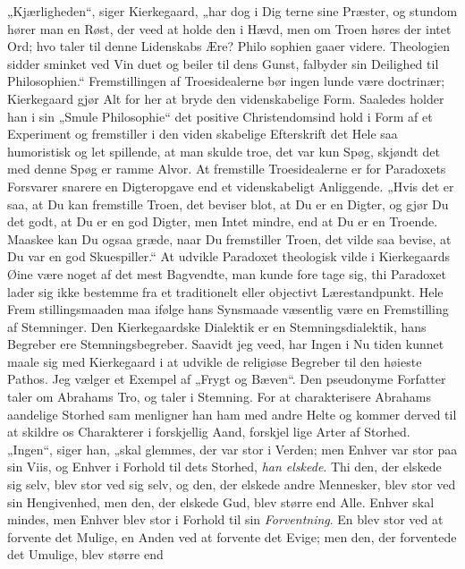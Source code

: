 \documentclass[12pt]{book}
\newcommand{\opage}[1]{\marginnote{\footnotesize\textit{[#1]}}}
\begin{document}
„Kjærligheden“, siger Kierkegaard, „har dog i Dig\-%
terne sine Præster, og stundom hører man en Røst, der
veed at holde den i Hævd, men om Troen høres der
intet Ord; hvo taler til denne Lidenskabs Ære? Philo\-%
sophien gaaer videre. Theologien sidder sminket ved Vin\-%
duet og beiler til dens Gunst, falbyder sin Deilighed til
Philosophien.“ Fremstillingen af Troesidealerne bør ingen\-%
lunde være doctrinær; Kierkegaard gjør Alt for her
\opage{231}\setcounter{footnote}{0}%
at bryde den videnskabelige Form. Saaledes holder han
i sin „Smule Philosophie“ det positive Christendomsind\-%
hold i Form af et Experiment og fremstiller i den viden\-%
skabelige Efterskrift det Hele saa humoristisk og let
spillende, at man skulde troe, det var kun Spøg, skjøndt
det med denne Spøg er ramme Alvor. At fremstille
Troesidealerne er for Paradoxets Forsvarer snarere en
Digteropgave end et videnskabeligt Anliggende. „Hvis
det er saa, at Du kan fremstille Troen, det beviser blot,
at Du er en Digter, og gjør Du det godt, at Du er
en god Digter, men Intet mindre, end at Du er en Troende.
Maaskee kan Du ogsaa græde, naar Du fremstiller Troen,
det vilde saa bevise, at Du var en god Skuespiller.“
At udvikle Paradoxet theologisk vilde i Kierkegaards
Øine være noget af det mest Bagvendte, man kunde fore\-%
tage sig, thi Paradoxet lader sig ikke bestemme fra et
traditionelt eller objectivt Lærestandpunkt. Hele Frem\-%
stillingsmaaden maa ifølge hans Synsmaade væsentlig
være en Fremstilling af Stemninger. Den Kierkegaardske
Dialektik er en Stemningsdialektik, hans Begreber ere
Stemningsbegreber. Saavidt jeg veed, har Ingen i Nu\-%
tiden kunnet maale sig med Kierkegaard i at udvikle de
religiøse Begreber til den høieste Pathos. Jeg vælger
et Exempel af „Frygt og Bæven“. Den pseudonyme
Forfatter taler om Abrahams Tro, og taler i Stemning.
For at charakterisere Abrahams aandelige Storhed sam\-%
menligner han ham med andre Helte og kommer derved
til at skildre os Charakterer i forskjellig Aand, forskjel\-%
lige Arter af Storhed. „Ingen“, siger han, „skal glemmes,
der var stor i Verden; men Enhver var stor paa sin
Viis, og Enhver i Forhold til dets Storhed, \emph{han elskede}.
Thi den, der elskede sig selv, blev stor ved sig selv,
og den, der elskede andre Mennesker, blev stor ved sin
Hengivenhed, men den, der elskede Gud, blev større
\opage{232}\setcounter{footnote}{0}%
end Alle. Enhver skal mindes, men Enhver blev stor i
Forhold til sin \emph{Forventning}. En blev stor ved at
forvente det Mulige, en Anden ved at forvente det Evige;
men den, der forventede det Umulige, blev større end
\end{document}
